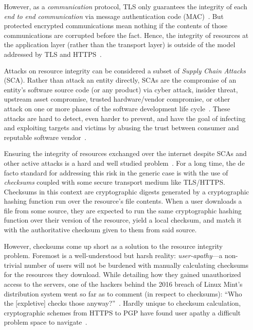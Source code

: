 However, as a \textit{communication} protocol, TLS only guarantees the integrity
of each \textit{end to end communication} via message authentication code
(MAC)~\cite{TLS1.2}. But protected encrypted communications mean nothing if the
contents of those communications are corrupted before the fact. Hence, the
integrity of resources at the application layer (rather than the transport
layer) is outside of the model addressed by TLS and HTTPS~\cite{TLS1.2, HTTPS}.

Attacks on resource integrity can be considered a subset of \emph{Supply Chain
Attacks} (SCA). Rather than attack an entity directly, SCAs are the compromise
of an entity's software source code (or any product) via cyber attack, insider
threat, upstream asset compromise, trusted hardware/vendor compromise, or other
attack on one or more phases of the software development life
cycle~\cite{NIST-SCA}. These attacks are hard to detect, even harder to prevent,
and have the goal of infecting and exploiting targets and victims by abusing the
trust between consumer and reputable software vendor~\cite{SCA}.

Ensuring the integrity of resources exchanged over the internet despite SCAs and
other active attacks is a hard and well studied problem~\cite{MD5Header,
HTTP1.1, HTTPS, SRI, LF, OpenPGP1, DNSSEC, PKI}. For a long time, the de facto
standard for addressing this risk in the generic case is with the use of
\textit{checksums} coupled with some secure transport medium like TLS/HTTPS.
Checksums in this context are cryptographic digests generated by a cryptographic
hashing function run over the resource's file contents. When a user downloads a
file from some source, they are expected to run the same cryptographic hashing
function over their version of the resource, yield a local checksum, and match
it with the authoritative checksum given to them from said source.

However, checksums come up short as a solution to the resource
integrity problem. Foremost is a well-understood but harsh reality: \emph{user-apathy}---a
non-trivial number of users will not be burdened with manually calculating
checksums for the resources they download. While detailing how they gained
unauthorized access to the servers, one of the hackers behind the 2016 breach of
Linux Mint's distribution system went so far as to comment (in respect to
checksums): ``Who the [expletive] checks those anyway?''~\cite{SCA-MINT3}.
Hardly unique to checksum calculation, cryptographic schemes from HTTPS to PGP
have found user apathy a difficult problem space to navigate~\cite{PGPBad,
Clickthrough}.

